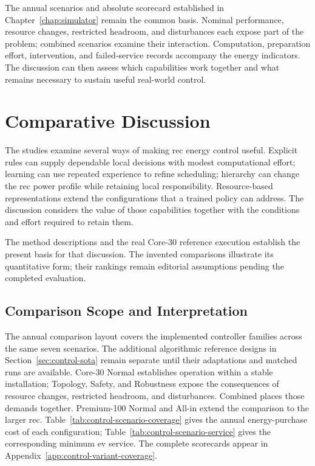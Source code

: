 The annual scenarios and absolute scorecard established in Chapter~\ref{chap:simulator} remain the common basis. Nominal performance, resource changes, restricted headroom, and disturbances each expose part of the problem; combined scenarios examine their interaction. Computation, preparation effort, intervention, and failed-service records accompany the energy indicators. The discussion can then assess which capabilities work together and what remains necessary to sustain useful real-world control.

\section{Comparative Discussion}
\label{sec:control-results}
\label{sec:control-open-limitations}

The studies examine several ways of making \gls{rec} energy control useful. Explicit rules can supply dependable local decisions with modest computational effort; learning can use repeated experience to refine scheduling; hierarchy can change the \gls{rec} power profile while retaining local responsibility. Resource-based representations extend the configurations that a trained policy can address. The discussion considers the value of those capabilities together with the conditions and effort required to retain them.

The method descriptions and the real Core-30 reference execution establish the present basis for that discussion. The invented comparisons illustrate its quantitative form; their rankings remain editorial assumptions pending the completed evaluation.

\subsection{Comparison Scope and Interpretation}
\label{sec:control-comparison-scope}

The annual comparison layout covers the implemented controller families across the same seven scenarios. The additional algorithmic reference designs in Section~\ref{sec:control-sota} remain separate until their adaptations and matched runs are available. Core-30 Normal establishes operation within a stable installation; Topology, Safety, and Robustness expose the consequences of resource changes, restricted headroom, and disturbances. Combined places those demands together. Premium-100 Normal and All-in extend the comparison to the larger \gls{rec}. Table~\ref{tab:control-scenario-coverage} gives the annual energy-purchase cost of each configuration; Table~\ref{tab:control-scenario-service} gives the corresponding minimum \gls{ev} service. The complete scorecards appear in Appendix~\ref{app:control-variant-coverage}.

